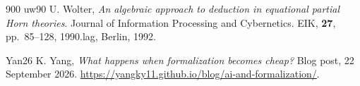 \begin{thebibliography}{900}
\bibitem%
{uw90} U. Wolter, \emph{An algebraic approach to deduction in equational partial Horn theories}. Journal of Information Processing and Cybernetics. EIK, \textbf{27}, pp.~85--128, 1990.lag, Berlin, 1992.

\bibitem%
{Yan26} K. Yang, \emph{What happens when formalization becomes cheap?} Blog post, 22 September 2026. \url{https://yangky11.github.io/blog/ai-and-formalization/}.



\end{thebibliography}

